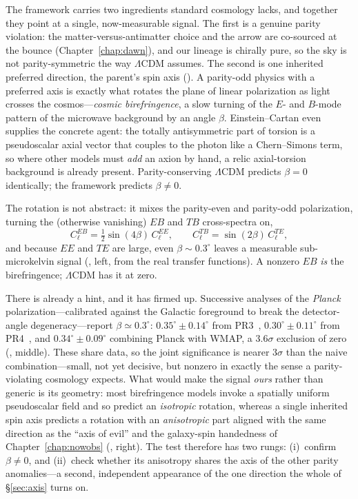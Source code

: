 The framework carries two ingredients standard cosmology lacks, and together they
point at a single, now-measurable signal. The first is a genuine parity violation:
the matter-versus-antimatter choice and the arrow are co-sourced at the bounce
(Chapter~\ref{chap:dawn}), and our lineage is chirally pure, so the sky is not
parity-symmetric the way $\Lambda$CDM assumes. The second is one inherited
preferred direction, the parent's spin axis (). A parity-odd
physics with a preferred axis is exactly what rotates the plane of linear
polarization as light crosses the cosmos---\emph{cosmic birefringence}, a slow
turning of the $E$- and $B$-mode pattern of the microwave background by an angle
$\beta$. Einstein--Cartan even supplies the concrete agent: the totally
antisymmetric part of torsion is a pseudoscalar axial vector that couples to the
photon like a Chern--Simons term, so where other models must \emph{add} an
axion by hand, a relic axial-torsion background is already present. Parity-conserving
$\Lambda$CDM predicts $\beta=0$ identically; the framework predicts $\beta\neq0$.

The rotation is not abstract: it mixes the parity-even and parity-odd polarization,
turning the (otherwise vanishing) $EB$ and $TB$ cross-spectra on,
\begin{equation}
  C_\ell^{EB}=\tfrac12\sin(4\beta)\,C_\ell^{EE},\qquad
  C_\ell^{TB}=\sin(2\beta)\,C_\ell^{TE},
  \label{eq:birefringence-eb}
\end{equation}
and because $EE$ and $TE$ are large, even $\beta\sim0.3^\circ$ leaves a measurable
sub-microkelvin signal (, left, from the real transfer
functions). A nonzero $EB$ \emph{is} the birefringence; $\Lambda$CDM has it at zero.

There is already a hint, and it has firmed up. Successive analyses of the
\emph{Planck} polarization---calibrated against the Galactic foreground to break the
detector-angle degeneracy---report $\beta\simeq0.3^\circ$: $0.35^\circ\pm0.14^\circ$
from PR3~\citep{minami2020}, $0.30^\circ\pm0.11^\circ$ from
PR4~\citep{diegopalazuelos2022}, and $0.34^\circ\pm0.09^\circ$ combining Planck with
WMAP, a $3.6\sigma$ exclusion of zero~\citep{eskilt2022} (,
middle). These share data, so the joint significance is nearer $3\sigma$ than the
naive combination---small, not yet decisive, but nonzero in exactly the sense a
parity-violating cosmology expects. What would make the signal \emph{ours} rather
than generic is its geometry: most birefringence models invoke a spatially uniform
pseudoscalar field and so predict an \emph{isotropic} rotation, whereas a single
inherited spin axis predicts a rotation with an \emph{anisotropic} part aligned with
the same direction as the ``axis of evil'' and the galaxy-spin handedness of
Chapter~\ref{chap:nowobs} (, right). The test therefore has
two rungs: (i)~confirm $\beta\neq0$, and (ii)~check whether its anisotropy shares the
axis of the other parity anomalies---a second, independent appearance of the one
direction the whole of \S\ref{sec:axis} turns on.

